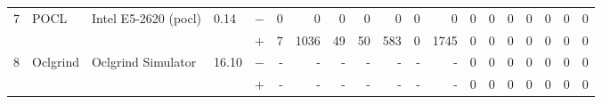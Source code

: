 \begin{tabular}{lllll | rrrrrrr | rrrrrrr }
\hline
\multirow{ 2}{*}{7} & \multirow{ 2}{*}{POCL} & \multirow{ 2}{*}{Intel E5-2620 (pocl)} & \multirow{ 2}{*}{0.14} & $-$ & 0 & 0 & 0 & 0 & 0 & 0 & 0 & 0 & 0 & 0 & 0 & 0 & 0 & 0 \\& & & & $+$ & 7 & 1036 & 49 & 50 & 583 & 0 & 1745 & 0 & 0 & 0 & 0 & 0 & 0 & 0 \\
\hline
\multirow{ 2}{*}{8} & \multirow{ 2}{*}{Oclgrind} & \multirow{ 2}{*}{Oclgrind Simulator} & \multirow{ 2}{*}{16.10} & $-$ & - & - & - & - & - & - & - & 0 & 0 & 0 & 0 & 0 & 0 & 0 \\& & & & $+$ & - & - & - & - & - & - & - & 0 & 0 & 0 & 0 & 0 & 0 & 0 \\
  \bottomrule
\end{tabular}

